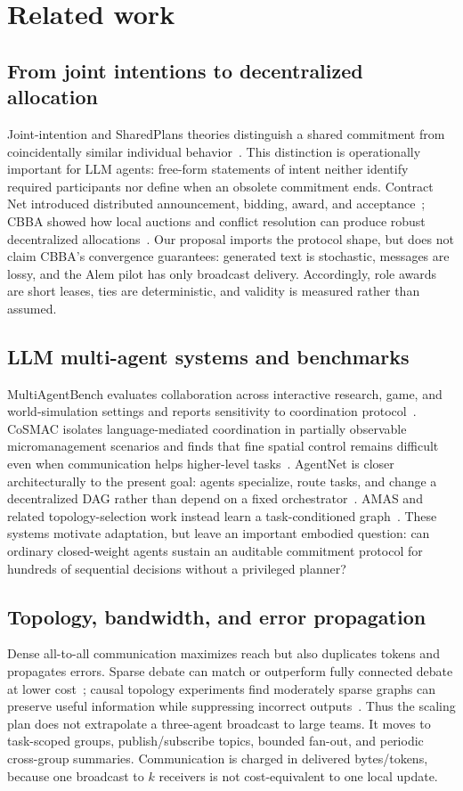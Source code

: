 \documentclass[11pt]{article}
\begin{document}
\section{Related work}
\subsection{From joint intentions to decentralized allocation}
Joint-intention and SharedPlans theories distinguish a shared commitment from coincidentally similar individual behavior~\citep{teamwork1991,sharedplans1996}. This distinction is operationally important for LLM agents: free-form statements of intent neither identify required participants nor define when an obsolete commitment ends. Contract Net introduced distributed announcement, bidding, award, and acceptance~\citep{contractnet1980}; CBBA showed how local auctions and conflict resolution can produce robust decentralized allocations~\citep{cbba2009}. Our proposal imports the protocol shape, but does not claim CBBA's convergence guarantees: generated text is stochastic, messages are lossy, and the Alem pilot has only broadcast delivery. Accordingly, role awards are short leases, ties are deterministic, and validity is measured rather than assumed.

\subsection{LLM multi-agent systems and benchmarks}
MultiAgentBench evaluates collaboration across interactive research, game, and world-simulation settings and reports sensitivity to coordination protocol~\citep{multiagentbench2025}. CoSMAC isolates language-mediated coordination in partially observable micromanagement scenarios and finds that fine spatial control remains difficult even when communication helps higher-level tasks~\citep{cosmac2026}. AgentNet is closer architecturally to the present goal: agents specialize, route tasks, and change a decentralized DAG rather than depend on a fixed orchestrator~\citep{agentnet2025}. AMAS and related topology-selection work instead learn a task-conditioned graph~\citep{amas2025}. These systems motivate adaptation, but leave an important embodied question: can ordinary closed-weight agents sustain an auditable commitment protocol for hundreds of sequential decisions without a privileged planner?

\subsection{Topology, bandwidth, and error propagation}
Dense all-to-all communication maximizes reach but also duplicates tokens and propagates errors. Sparse debate can match or outperform fully connected debate at lower cost~\citep{sparsedebate2024}; causal topology experiments find moderately sparse graphs can preserve useful information while suppressing incorrect outputs~\citep{topology2025}. Thus the scaling plan does not extrapolate a three-agent broadcast to large teams. It moves to task-scoped groups, publish/subscribe topics, bounded fan-out, and periodic cross-group summaries. Communication is charged in delivered bytes/tokens, because one broadcast to $k$ receivers is not cost-equivalent to one local update.
\end{document}
